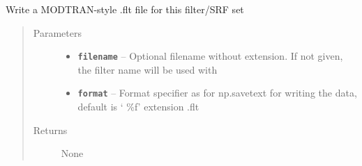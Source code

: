 \documentclass[a4paper,10pt,english]{sphinxmanual}
\begin{document}
\begin{fulllineitems}
\begin{fulllineitems}
\end{fulllineitems}


\begin{fulllineitems}
\label{packages:radute.Flt.write}
Write a MODTRAN-style .flt file for this filter/SRF set
\begin{quote}\begin{description}
\item[{Parameters}] \leavevmode\begin{itemize}
\item {} 
\textbf{\texttt{filename}} -- Optional filename without extension. If not given, the filter name will be used with

\item {} 
\textbf{\texttt{format}} -- Format specifier as for np.savetext for writing the data, default is `  \%f'
extension .flt

\end{itemize}

\item[{Returns}] \leavevmode
None

\end{description}\end{quote}

\end{fulllineitems}


\end{fulllineitems}

\end{document}
